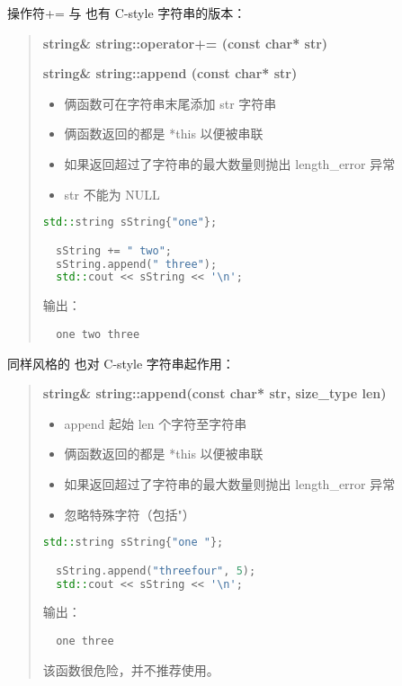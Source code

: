 \documentclass[../../LearnCpp.tex]{subfiles}
\begin{document}
操作符+= 与  也有 C-style 字符串的版本：

\begin{quotation}
  \textbf{string\& string::operator+= (const char* str)} \

  \textbf{string\& string::append (const char* str)}

  \begin{itemize}
    \item 俩函数可在字符串末尾添加 str 字符串
    \item 俩函数返回的都是 *this 以便被串联
    \item 如果返回超过了字符串的最大数量则抛出 length\_error 异常
    \item str 不能为 NULL
  \end{itemize}

  \begin{lstlisting}[language=C++]
  std::string sString{"one"};

  sString += " two";
  sString.append(" three");
  std::cout << sString << '\n';
  \end{lstlisting}

  输出：

  \begin{lstlisting}
  one two three
  \end{lstlisting}
\end{quotation}

同样风格的  也对 C-style 字符串起作用：

\begin{quotation}
  \textbf{string\& string::append(const char* str, size\_type len)}

  \begin{itemize}
    \item append 起始 len 个字符至字符串
    \item 俩函数返回的都是 *this 以便被串联
    \item 如果返回超过了字符串的最大数量则抛出 length\_error 异常
    \item 忽略特殊字符（包括"）
  \end{itemize}

  \begin{lstlisting}[language=C++]
  std::string sString{"one "};

  sString.append("threefour", 5);
  std::cout << sString << '\n';
  \end{lstlisting}

  输出：

  \begin{lstlisting}
  one three
  \end{lstlisting}

  该函数很危险，并不推荐使用。
\end{quotation}
\end{document}
